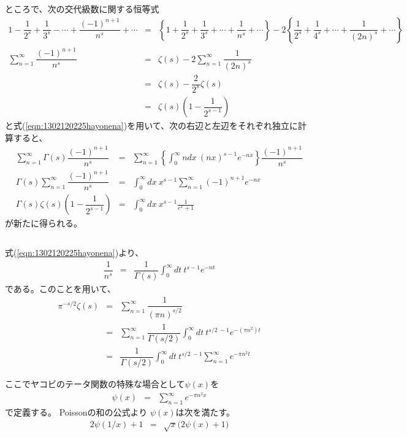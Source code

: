 \documentclass[uplatex,a4j,12pt,dvipdfmx]{jsarticle}
\begin{document}
ところで、次の交代級数に関する恒等式
\begin{eqnarray}
	1
	-
	\dfrac{1}{2^{s}}
	+
	\dfrac{1}{3^{s}}
	-
	\cdots
	+
	\dfrac{(-1)^{n+1}}{n^{s}}
	+
	\cdots
	&=&
	\left\{
	1
	+
	\dfrac{1}{2^{s}}
	+
	\dfrac{1}{3^{s}}
	+
	\cdots
	+
	\dfrac{1}{n^{s}}
	+
	\cdots
	\right\}
	-
	2
	\left\{
	\dfrac{1}{2^{s}}
	+
	\dfrac{1}{4^{s}}
	+
	\cdots
	+
	\dfrac{1}{(2n)^{s}}
	+
	\cdots
	\right\}
	\nonumber \\
	\sum_{n=1}^{\infty}
	\dfrac{(-1)^{n+1}}{n^{s}}
	&=&
	\zeta(s)
	-
	2
	\sum_{n=1}^{\infty}
	\dfrac{1}{(2n)^{s}}
	\nonumber \\ &=&
	\zeta(s)
	-
	\dfrac{2}{2^{s}}
	\zeta(s)
	\nonumber \\ &=&
	\zeta(s)
	\left(
	1
	-
	\dfrac{1}{2^{s-1}}
	\right)
\end{eqnarray}
と式(\ref{eqn:1302120225hayonena})を用いて、次の右辺と左辺をそれぞれ独立に計算すると、
\begin{eqnarray}
	\sum_{n=1}^{\infty}
	\Gamma(s)
	\dfrac{(-1)^{n+1}}{n^{s}}
	&=&
	\sum_{n=1}^{\infty}
	\left\{
	\int^{\infty}_{0}
	\!\! ndx
	\ \! (nx)^{s-1} e^{-nx}
	\right\}
	\dfrac{(-1)^{n+1}}{n^{s}}
	\nonumber \\
	\Gamma(s)
	\sum_{n=1}^{\infty}
	\dfrac{(-1)^{n+1}}{n^{s}}
	&=&
	\int^{\infty}_{0}
	\!\! dx
	\ \! x^{s-1}
	\sum_{n=1}^{\infty}
	(-1)^{n+1}
	e^{-nx}
	\nonumber \\
	\Gamma(s)
	\zeta(s)
	\left(
	1
	-
	\dfrac{1}{2^{s-1}}
	\right)
	&=&
	\int^{\infty}_{0}
	\!\! dx
	\ \! x^{s-1}
	\frac{1}{e^{x} + 1}
\end{eqnarray}
が新たに得られる。

${}$

式(\ref{eqn:1302120225hayonena})より、
\begin{eqnarray}
	\dfrac{1}{n^{s}}
	&=&
	\dfrac{1}{\Gamma(s)}
	\int^{\infty}_{0}
	dt \ \! t^{s-1} e^{-nt}
\end{eqnarray}
である。このことを用いて、
\begin{eqnarray}
	\pi^{-s/2}
	\zeta(s)
	&=&
	\sum_{n=1}^{\infty}
	\dfrac{1}{(\pi n )^{s/2}}
	\nonumber \\ &=&
	\sum_{n=1}^{\infty}
	\dfrac{1}{\Gamma(s/2)}
	\int^{\infty}_{0}
	dt \ \! t^{s/2 \ \! -1} e^{-(\pi n^{2})t}
	\nonumber \\ &=&
	\dfrac{1}{\Gamma(s/2)}
	\int^{\infty}_{0}
	dt \ \! t^{s/2 \ \! -1}
	\sum_{n=1}^{\infty}
	e^{- \pi n^{2} t}
\end{eqnarray}

ここでヤコビのテータ関数の特殊な場合として$\psi(x)$を
\begin{eqnarray}
	\psi(x)
	&=&
	\sum_{n=1}^{\infty}
	e^{- \pi n^{2} x}
\end{eqnarray}
で定義する。
Poissonの和の公式より
$\psi(x)$は次を満たす。
\begin{eqnarray}
	2 \psi ( 1/x )
	+
	1
	&=&
	\sqrt{x}
	\Big( 2 \psi(x) + 1 \Big)
\end{eqnarray}
\end{document}
